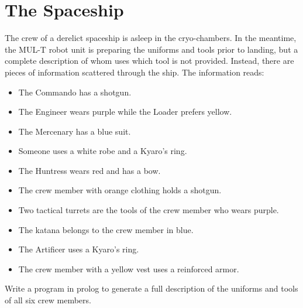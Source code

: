 \documentclass{article}
\begin{document}
\section{The Spaceship}

The crew of a derelict spaceship is asleep in the cryo-chambers.
In the meantime, the MUL-T robot unit is preparing the uniforms and tools prior to landing, but a complete description of whom uses which tool is not provided. Instead, there are pieces of information scattered through the ship. The information reads:

\begin{itemize}
    \item The Commando has a shotgun.
    \item The Engineer wears purple while the Loader prefers yellow.
    \item The Mercenary has a blue suit.
    \item Someone uses a white robe and a Kyaro's ring.
    \item The Huntress wears red and has a bow.
    \item The crew member with orange clothing holds a shotgun.
    \item Two tactical turrets are the tools of the crew member who wears purple.
    \item The katana belongs to the crew member in blue.
    \item The Artificer uses a Kyaro's ring.
    \item The crew member with a yellow vest uses a reinforced armor.
\end{itemize}

Write a program in prolog to generate a full description of the uniforms and tools of all six crew members.
\end{document}
